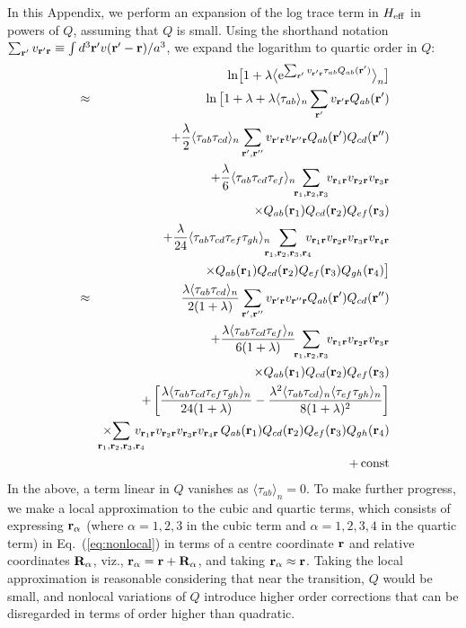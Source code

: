 \documentclass[jcp,aps,twocolumn,showpacs,supergroupedaddress,epsfig,amsmath,amssymb,eqsecnum]{revtex4}
\newcommand{\ba}{\begin{eqnarray}}
\newcommand{\ea}{\end{eqnarray}}
\newcommand{\rv}{{\bf r}}
\newcommand{\Rv}{{\bf R}}
\begin{document}
In this Appendix, we perform an expansion of the log trace term in $H_{{\rm eff}}$ in powers of $Q$, assuming that $Q$ is small. Using the shorthand notation $\sum_{\rv'} v_{\rv'\rv} \equiv \int d^3\rv' v(\rv'-\rv)/a^3$, we expand the logarithm to quartic order in $Q$: 
\ba
\label{eq:nonlocal}
&&\ln \! \big[ 
1 + \lambda \big\langle 
{\rm e}^{\sum_{\rv'} v_{\rv'\rv}\tau_{ab} Q_{ab}(\rv')}
\big\rangle_{n}
\big]
\\
&\approx& 
\ln \big[
1+ \lambda 
+ \lambda \langle \tau_{ab} \rangle_n \sum_{\rv'} v_{\rv'\rv} Q_{ab}(\rv')
\nonumber\\
&&\quad
+
\frac{\lambda}{2} 
\langle \tau_{ab}\tau_{cd} \rangle_n 
\sum_{\rv',\rv''} v_{\rv'\rv} v_{\rv''\rv}
Q_{ab}(\rv') Q_{cd}(\rv'')
\nonumber\\
&&\quad +
\frac{\lambda}{6}
\langle \tau_{ab}  \tau_{cd}  \tau_{ef} \rangle_n 
\!\! \sum_{\rv_1,\rv_2,\rv_3} \!\! 
v_{\rv_1\rv} v_{\rv_2\rv} v_{\rv_3\rv}
\nonumber\\
&&\qquad\times
Q_{ab}(\rv_1) Q_{cd}(\rv_2) Q_{ef}(\rv_3)
\nonumber\\
&&\quad +
\frac{\lambda}{24}
\langle \tau_{ab} \tau_{cd} \tau_{ef} \tau_{gh} \rangle_n 
\!\!\!\! \sum_{\rv_1,\rv_2,\rv_3,\rv_4} \!\!\!\! 
v_{\rv_1\rv} v_{\rv_2\rv} v_{\rv_3\rv} v_{\rv_4\rv}
\nonumber\\
&&\qquad\times
Q_{ab}(\rv_1) Q_{cd}(\rv_2) Q_{ef}(\rv_3) Q_{gh}(\rv_4) 
\big]
\nonumber\\
&\approx&
\frac{\lambda \langle \tau_{ab}\tau_{cd} \rangle_n}{2 (1+\lambda)} 
\sum_{\rv',\rv''} v_{\rv'\rv} v_{\rv''\rv}
Q_{ab}(\rv') Q_{cd}(\rv'')
\nonumber\\
&&\quad 
+
\frac{\lambda \langle \tau_{ab}  \tau_{cd}  \tau_{ef} \rangle_n}{6 (1+\lambda)}
\!\! \sum_{\rv_1,\rv_2,\rv_3} \!\! 
v_{\rv_1\rv} v_{\rv_2\rv} v_{\rv_3\rv}
\nonumber\\
&&\qquad\times
Q_{ab}(\rv_1) Q_{cd}(\rv_2) Q_{ef}(\rv_3)
\nonumber\\
&& +
\left[ 
\frac{\lambda \langle \tau_{ab} \tau_{cd} \tau_{ef} \tau_{gh} \rangle_n}{24 (1+\lambda)}
-
\frac{\lambda^2 \langle \tau_{ab} \tau_{cd} \rangle_n \langle \tau_{ef} \tau_{gh} \rangle_n}{8 (1+\lambda)^2}
\right]
 \nonumber\\
 &&\times \!\!\!\!
 \!\!\!\! \sum_{\rv_1,\rv_2,\rv_3,\rv_4} \!\!\!\!\!\! 
v_{\rv_1\rv} v_{\rv_2\rv} v_{\rv_3\rv} v_{\rv_4\rv} \, 
Q_{ab}(\rv_1) Q_{cd}(\rv_2) Q_{ef}(\rv_3) Q_{gh}(\rv_4) 
\nonumber\\
 &&+ \, {\rm const}
\nonumber
\ea
In the above, a term linear in $Q$ vanishes as $\langle \tau_{ab} \rangle_n = 0$. 
To make further progress, we make a local approximation to the cubic and quartic terms, which consists of expressing $\rv_\alpha$ (where $\alpha=1,2,3$ in the cubic term and $\alpha=1,2,3,4$ in the quartic term) in Eq.~(\ref{eq:nonlocal}) in terms of a centre coordinate $\rv$ and relative coordinates $\Rv_\alpha$, viz., $\rv_\alpha = \rv+\Rv_\alpha$, and taking $\rv_\alpha \approx \rv$. Taking the local approximation is reasonable considering that near the transition, $Q$ would be small, and nonlocal variations of $Q$ introduce higher order corrections that can  be disregarded in terms of order higher than quadratic.
\end{document}
